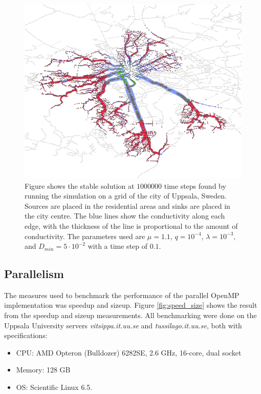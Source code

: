 \begin{figure}
\centering
\includegraphics[width=\textwidth]{img/uppsala.png}
\caption{Figure shows the stable solution at $1000000$ time steps found by running the simulation on a grid of the city of Uppsala, Sweden. Sources are placed in the residential areas and sinks are placed in the city centre. The blue lines show the conductivity along each edge, with the thickness of the line is proportional to the amount of conductivity. The parameters used are $\mu = 1.1$, $q = 10^{-4}$, $\lambda = 10^{-3},$ and $D_{min}=5 \cdot 10^{-2}$ with a time step of $0.1$.}
\label{fig:uppsala}
\end{figure}

\subsection{Parallelism}
The measures used to benchmark the performance of the parallel OpenMP implementation was speedup and sizeup. Figure \ref{fig:speed_size} shows the result from the speedup and sizeup measurements. All benchmarking were done on the Uppsala University servers \textit{vitsippa.it.uu.se} and \textit{tussilago.it.uu.se}, both with specifications: 

\begin{itemize}
\item CPU: AMD Opteron (Bulldozer) 6282SE, 2.6 GHz, 16-core, dual socket
\item Memory: 128 GB
\item OS: Scientific Linux 6.5.
\end{itemize}

